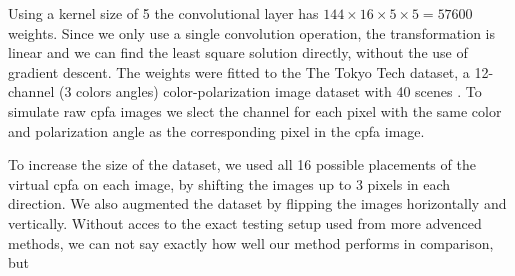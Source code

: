 Using a kernel size of 5 the convolutional layer has $144\times16\times5\times5=57600$ weights.
Since we only use a single convolution operation, the transformation is linear and we can find the least square solution directly, without the use of gradient descent.
The weights were fitted to the The Tokyo Tech dataset, a 12-channel (3 colors  angles) color-polarization image dataset with 40 scenes \cite{morimatsuMonochromeColorPolarization2020}\cite{morimatsuMonochromeColorPolarization2021}.
To simulate raw \gls{cpfa} images we slect the channel for each pixel with the same color and polarization angle as the corresponding pixel in the \gls{cpfa} image.

To increase the size of the dataset, we used all 16 possible placements of the virtual \gls{cpfa} on each image, by shifting the images up to 3 pixels in each direction.
We also augmented the dataset by flipping the images horizontally and vertically.
Without acces to the exact testing setup used from more advenced methods, we can not say exactly how well our method performs in comparison, but


